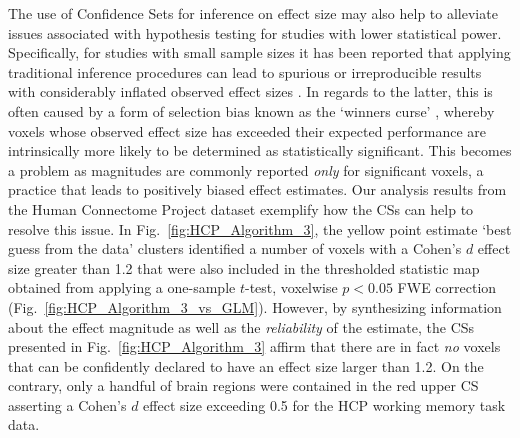 The use of Confidence Sets for inference on effect size may also help to alleviate issues associated with hypothesis testing for studies with lower statistical power. Specifically, for studies with small sample sizes it has been reported that applying traditional inference procedures can lead to spurious or irreproducible results with considerably inflated observed effect sizes \citep{Poldrack2017-rr, Cremers2017-qk}. In regards to the latter, this is often caused by a form of selection bias known as the `winners curse' \citep{Reddan2017-rk, Button2013-ni}, whereby voxels whose observed effect size has exceeded their expected performance are intrinsically more likely to be determined as statistically significant. This becomes a problem as magnitudes are commonly reported \textit{only} for significant voxels, a practice that leads to positively biased effect estimates. Our analysis results from the Human Connectome Project dataset exemplify how the CSs can help to resolve this issue. In Fig.\ \ref{fig:HCP_Algorithm_3}, the yellow point estimate `best guess from the data' clusters identified a number of voxels with a Cohen's $d$ effect size greater than 1.2 that were also included in the thresholded statistic map obtained from applying a one-sample $t$-test, voxelwise $p < 0.05$ FWE correction (Fig.\ \ref{fig:HCP_Algorithm_3_vs_GLM}). However, by synthesizing information about the effect magnitude as well as the \textit{reliability} of the estimate, the CSs presented in Fig.\ \ref{fig:HCP_Algorithm_3} affirm that there are in fact \textit{no} voxels that can be confidently declared to have an effect size larger than 1.2. On the contrary, only a handful of brain regions were contained in the red upper CS asserting a Cohen's $d$ effect size exceeding 0.5 for the HCP working memory task data.

